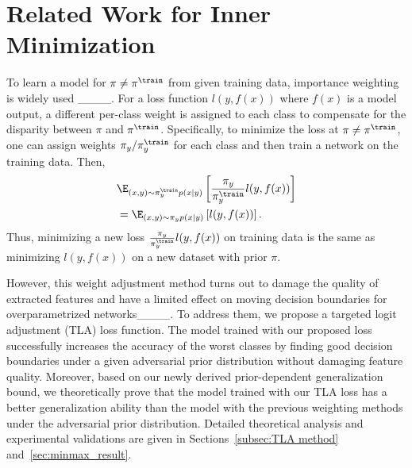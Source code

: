 \section{Related Work for Inner Minimization}
\label{subsec:related_work_min}

To learn a model for $\pi \ne \pi^{\train}$ from given training data, importance weighting is widely used ____. For a loss function $l(y,f(x))$ where $f(x)$ is a model output, a different per-class weight is assigned to each class to compensate for the disparity between $\pi$ and $\pi^{\train}$. Specifically, to minimize the loss at $\pi \ne \pi^{\train}$, one can assign weights $\pi_{y} / \pi^{\train}_{y}$ for each class and then train a network on the training data. Then,
\begin{align}
&\E_{(x,y)\sim \pi^{\train}_{y} p(x|y)} \left[ \frac{\pi_{y}}{\pi^{\train}_{y}} l(y,f(x))  \right] \\
&= \E_{(x,y) \sim \pi_{y} p(x|y)} \left[ l(y,f(x))  \right].
\end{align}
Thus, minimizing a new loss $\frac{\pi_{y}}{\pi^{\train}_{y}} l(y,f(x))$ on training data is the same as minimizing $l(y,f(x))$ on a new dataset with prior $\pi$.

However, this weight adjustment method turns out to damage the quality of extracted features and have a limited effect on moving decision boundaries for overparametrized networks____. To address them, we propose a targeted logit adjustment (TLA) loss function. The model trained with our proposed loss successfully increases the accuracy of the worst classes by finding good decision boundaries under a given adversarial prior distribution without damaging feature quality. 
 Moreover, based on our newly derived prior-dependent generalization bound, we theoretically prove that the model trained with our TLA loss has a better generalization ability than the model with the previous weighting methods under the adversarial prior distribution. Detailed theoretical analysis and experimental validations are given in Sections~\ref{subsec:TLA method} and~\ref{sec:minmax_result}.